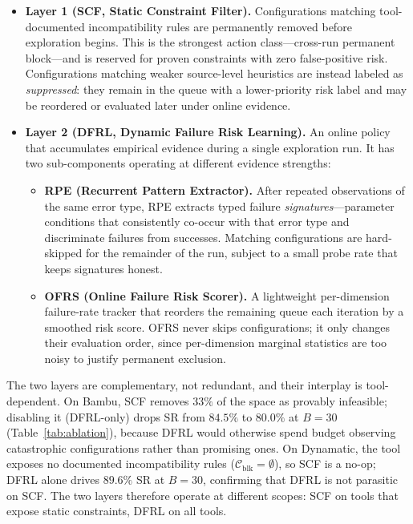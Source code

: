 \documentclass[journal]{IEEEtran}
\begin{document}
\begin{itemize}
\item \textbf{Layer 1 (SCF, Static Constraint Filter).} Configurations matching tool-documented incompatibility rules are permanently removed before exploration begins. This is the strongest action class---cross-run permanent block---and is reserved for proven constraints with zero false-positive risk. Configurations matching weaker source-level heuristics are instead labeled as \emph{suppressed}: they remain in the queue with a lower-priority risk label and may be reordered or evaluated later under online evidence.
\item \textbf{Layer 2 (DFRL, Dynamic Failure Risk Learning).} An online policy that accumulates empirical evidence during a single exploration run. It has two sub-components operating at different evidence strengths:
\begin{itemize}
    \item \textbf{RPE (Recurrent Pattern Extractor).} After repeated observations of the same error type, RPE extracts typed failure \emph{signatures}---parameter conditions that consistently co-occur with that error type and discriminate failures from successes. Matching configurations are hard-skipped for the remainder of the run, subject to a small probe rate that keeps signatures honest.
    \item \textbf{OFRS (Online Failure Risk Scorer).} A lightweight per-dimension failure-rate tracker that reorders the remaining queue each iteration by a smoothed risk score. OFRS never skips configurations; it only changes their evaluation order, since per-dimension marginal statistics are too noisy to justify permanent exclusion.
\end{itemize}
\end{itemize}

The two layers are complementary, not redundant, and their interplay is tool-dependent. On Bambu, SCF removes $33\%$ of the space as provably infeasible; disabling it (DFRL-only) drops SR from $84.5\%$ to $80.0\%$ at $B{=}30$ (Table~\ref{tab:ablation}), because DFRL would otherwise spend budget observing catastrophic configurations rather than promising ones. On Dynamatic, the tool exposes no documented incompatibility rules ($\mathcal{C}_{\text{blk}} = \emptyset$), so SCF is a no-op; DFRL alone drives $89.6\%$ SR at $B{=}30$, confirming that DFRL is not parasitic on SCF. The two layers therefore operate at different scopes: SCF on tools that expose static constraints, DFRL on all tools.
\end{document}
